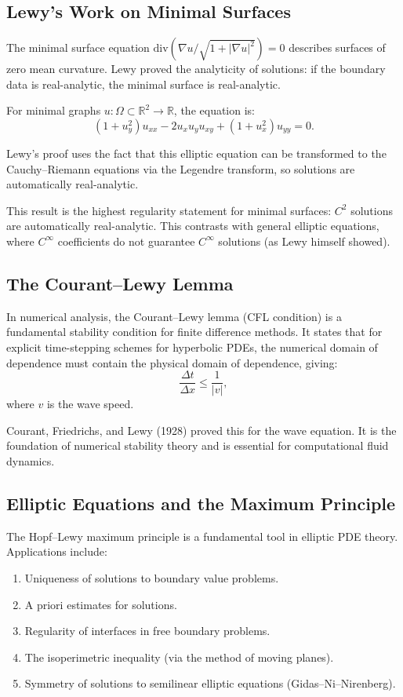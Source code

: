 \subsection{Lewy's Work on Minimal Surfaces}

The minimal surface equation $\text{div}(\nabla u / \sqrt{1 + |\nabla u|^2}) = 0$ describes surfaces of zero mean curvature. Lewy proved the analyticity of solutions: if the boundary data is real-analytic, the minimal surface is real-analytic.

For minimal graphs $u: \Omega \subset \mathbb{R}^2 \to \mathbb{R}$, the equation is:
\[
(1+u_y^2) u_{xx} - 2 u_x u_y u_{xy} + (1+u_x^2) u_{yy} = 0.
\]

Lewy's proof uses the fact that this elliptic equation can be transformed to the Cauchy--Riemann equations via the Legendre transform, so solutions are automatically real-analytic.

This result is the highest regularity statement for minimal surfaces: $C^2$ solutions are automatically real-analytic. This contrasts with general elliptic equations, where $C^\infty$ coefficients do not guarantee $C^\infty$ solutions (as Lewy himself showed).

\subsection{The Courant--Lewy Lemma}

In numerical analysis, the Courant--Lewy lemma (CFL condition) is a fundamental stability condition for finite difference methods. It states that for explicit time-stepping schemes for hyperbolic PDEs, the numerical domain of dependence must contain the physical domain of dependence, giving:
\[
\frac{\Delta t}{\Delta x} \leq \frac{1}{|v|},
\]
where $v$ is the wave speed.

Courant, Friedrichs, and Lewy (1928) proved this for the wave equation. It is the foundation of numerical stability theory and is essential for computational fluid dynamics.

\subsection{Elliptic Equations and the Maximum Principle}

The Hopf--Lewy maximum principle is a fundamental tool in elliptic PDE theory. Applications include:
\begin{enumerate}
    \item Uniqueness of solutions to boundary value problems.
    \item A priori estimates for solutions.
    \item Regularity of interfaces in free boundary problems.
    \item The isoperimetric inequality (via the method of moving planes).
    \item Symmetry of solutions to semilinear elliptic equations (Gidas--Ni--Nirenberg).
\end{enumerate}

